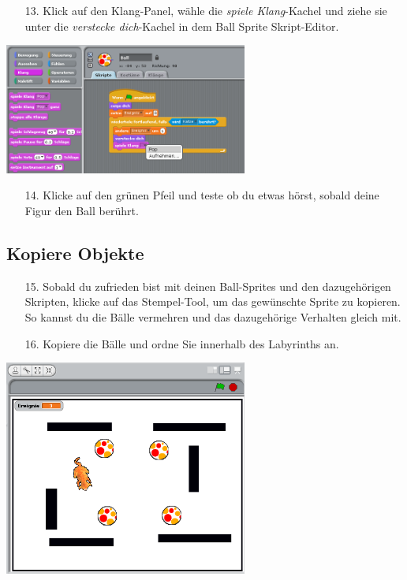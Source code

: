 \begin{itemize}
\item[13.] Klick auf den Klang-Panel, wähle die \textit{spiele Klang}-Kachel und ziehe sie unter die \textit{verstecke dich}-Kachel in dem Ball Sprite Skript-Editor.
\end{itemize}
\includegraphics[width=0.6\textwidth]{images/aufgabe3_ball3.png}
\begin{itemize}
\item[14.] Klicke auf den grünen Pfeil und teste ob du etwas hörst, sobald deine Figur den Ball berührt.
\end{itemize}


\subsection{Kopiere Objekte}
\begin{itemize}
\item[15.] Sobald du zufrieden bist mit deinen Ball-Sprites und den dazugehörigen Skripten, klicke auf das Stempel-Tool, um das gewünschte Sprite zu kopieren. So kannst du die Bälle vermehren und das dazugehörige Verhalten gleich mit.
\item[16.] Kopiere die Bälle und ordne Sie innerhalb des Labyrinths an.
\end{itemize}
\includegraphics[width=0.6\textwidth]{images/aufgabe3_vier_baelle.png}

